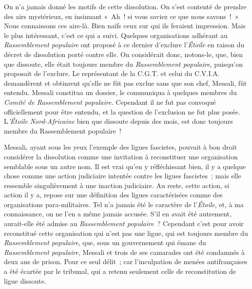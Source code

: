 \documentclass[french,twoside]{book} %
\begin{document}
\noindent \par
On n'a jamais donné les motifs de cette dissolution. On s'est contenté de prendre des airs mystérieux, en insinuant « Ah ! si vous saviez ce que nous savons ! » Nous connaissons ces airs-là. Bien naïfs ceux sur qui ils feraient impression. Mais le plus intéressant, c'est ce qui a suivi. Quelques organi­sations adhérant au {\itshape Rassemblement populaire} ont proposé à ce dernier d'exclure l'{\itshape Étoile} en raison du décret de dissolution porté contre elle. On considérait donc, notons-le, que, bien que dissoute, elle était toujours membre du {\itshape Rassemblement populaire}, puisqu'on proposait de l'exclure. Le représentant de la C.G.T. et celui du C.V.I.A. demandèrent et obtinrent qu'elle ne fût pas exclue sans que son chef, Messali, fût entendu. Messali constitua un dossier, le communiqua à quelques membres du {\itshape Comité de Rassemblement populaire.} Cependant il ne fut pas convoqué officiellement pour être entendu, et la ques­tion de l'exclusion ne fut plus posée. L{\itshape 'Étoile Nord-Africaine} bien que dissoute depuis des mois, est donc toujours membre du Rassemblement populaire !\par
Messali, ayant sous les yeux l'exemple des ligues fascistes, pouvait à bon droit considérer la dissolution comme une invitation à reconstituer une organisation semblable sous un autre nom. Il est vrai qu'en y réfléchissant bien, il y a quelque chose comme une action judiciaire intentée contre les ligues fascistes ; mais elle ressemble singulièrement à une inaction judiciaire. Au reste, cette action, si action il y a, repose sur une définition des ligues caractérisées comme des organisations para-militaires. Tel n'a jamais été le caractère de l'{\itshape Étoile}, et, à ma connaissance, on ne l'en a même jamais accusée. S'il en avait été autrement, aurait-elle été admise au {\itshape Rassemblement popu­laire} ? Cependant c'est pour avoir reconstitué cette organisation qui n'est pas une ligue, qui est toujours membre du {\itshape Rassemblement populaire}, que, sous un gouvernement qui émane du {\itshape Rassemblement populaire}, Messali et trois de ses camarades ont été condamnés à deux ans de prison. Pour ce seul délit ; car l'inculpation de menées antifrançaises a été écartée par le tribunal, qui a retenu seulement celle de reconstitution de ligue dissoute.\par
\par
\end{document}
